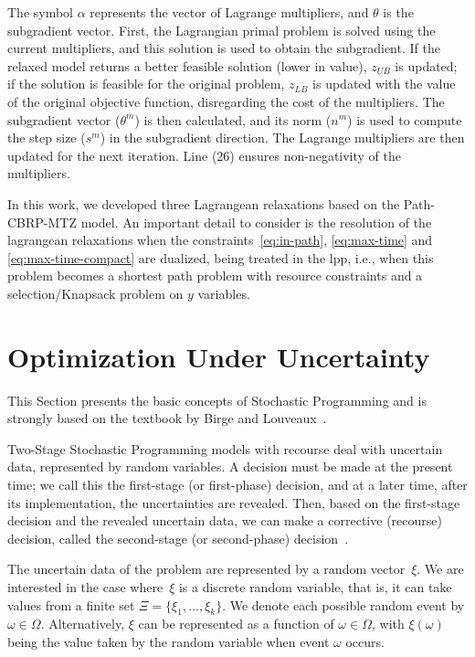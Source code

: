 The symbol $\alpha$ represents the vector of Lagrange multipliers, and $\theta$
is the subgradient vector. First, the Lagrangian primal problem is solved using
the current multipliers, and this solution is used to obtain the subgradient. If
the relaxed model returns a better feasible solution (lower in value), $z_{UB}$
is updated; if the solution is feasible for the original problem, $z_{LB}$ is
updated with the value of the original objective function, disregarding the cost
of the multipliers. The subgradient vector ($\theta^m$) is then calculated, and
its norm ($n^m$) is used to compute the step size ($s^m$) in the subgradient
direction. The Lagrange multipliers are then updated for the next iteration.
Line (26) ensures non-negativity of the multipliers.

In this work, we developed three Lagrangean relaxations based on the
Path-CBRP-MTZ model. An important detail to consider is the resolution of the
lagrangean relaxations when the constraints~\eqref{eq:in-path},
\eqref{eq:max-time} and \eqref{eq:max-time-compact}  are dualized, being treated
in the \gls{lpp}, i.e., when this problem becomes a shortest path problem with
resource constraints and a selection/Knapsack problem on $y$ variables.

\section{Optimization Under Uncertainty}\label{sec:optimization-under-uncertainty}

This Section presents the basic concepts of Stochastic Programming and is
strongly based on the textbook by Birge and Louveaux~\cite{birge:2011}.

Two-Stage Stochastic Programming models with recourse deal with uncertain data,
represented by random variables. A decision must be made at the present time; we
call this the first-stage (or first-phase) decision, and at a later time, after
its implementation, the uncertainties are revealed. Then, based on the
first-stage decision and the revealed uncertain data, we can make a corrective
(recourse) decision, called the second-stage (or second-phase)
decision~\cite{birge:2011}.

The uncertain data of the problem are represented by a random vector~$\xi$. We
are interested in the case where~$\xi$ is a discrete random variable, that is,
it can take values from a finite set $\Xi = \{\xi_{1}, \ldots, \xi_{k}\}$. We
denote each possible random event by $\omega \in \Omega$. Alternatively, $\xi$
can be represented as a function of $\omega \in \Omega$, with $\xi(\omega)$
being the value taken by the random variable when event $\omega$ occurs.

